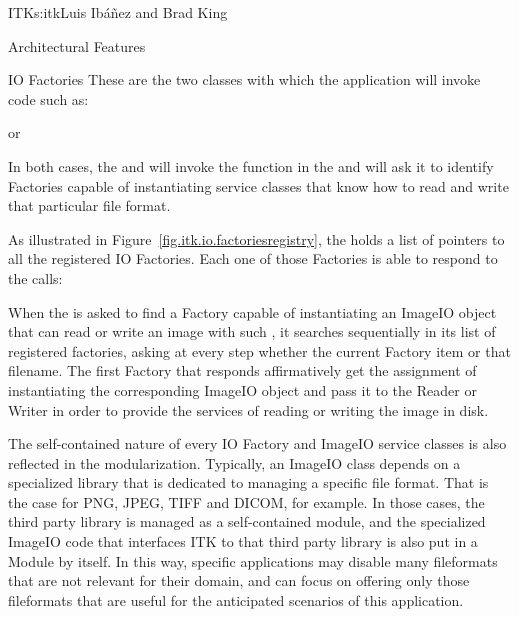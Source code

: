 \begin{aosachapter}{ITK}{s:itk}{Luis Ib\'{a}\~{n}ez and Brad King}
\begin{aosasect1}{Architectural Features}
\begin{aosasect2}{IO Factories}
These are the two classes with which the application will invoke code such as:

\begin{aosaitemize}
\item {}
\item {}
\end{aosaitemize}

or

\begin{aosaitemize}
\item {}
\item {}
\end{aosaitemize}

In both cases, the  and  will
invoke the  function in the  and
will ask it to identify Factories capable of instantiating service classes that
know how to read and write that particular file format.

As illustrated in Figure~\ref{fig.itk.io.factoriesregistry}, the
 holds a list of pointers to all the registered IO
Factories. Each one of those Factories is able to respond to the calls:

\begin{aosaitemize}
\item {}
\item {}
\end{aosaitemize}

When the  is asked to find a Factory capable of
instantiating an ImageIO object that can read or write an image with such
, it searches sequentially in its list of registered factories,
asking at every step whether the current Factory item  or
 that filename. The first Factory that responds affirmatively
get the assignment of instantiating the corresponding ImageIO object and pass
it to the Reader or Writer in order to provide the services of reading or
writing the image in disk.

The self-contained nature of every IO Factory and ImageIO service classes is
also reflected in the modularization. Typically, an ImageIO class depends on a
specialized library that is dedicated to managing a specific file format. That
is the case for PNG, JPEG, TIFF and DICOM, for example. In those cases, the
third party library is managed as a self-contained module, and the specialized
ImageIO code that interfaces ITK to that third party library is also put in a
Module by itself. In this way, specific applications may disable many
fileformats that are not relevant for their domain, and can focus on offering
only those fileformats that are useful for the anticipated scenarios of this
application.


\end{aosasect2}
\end{aosasect1}
\end{aosachapter}

